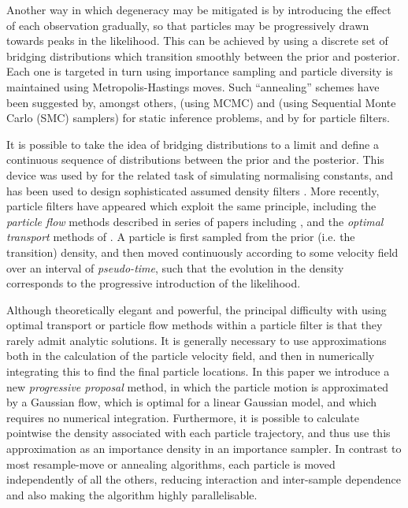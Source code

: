 \documentclass{article}
\begin{document}
Another way in which degeneracy may be mitigated is by introducing the effect of each observation gradually, so that particles may be progressively drawn towards peaks in the likelihood. This can be achieved by using a discrete set of bridging distributions which transition smoothly between the prior and posterior. Each one is targeted in turn using importance sampling and particle diversity is maintained using Metropolis-Hastings moves. Such ``annealing'' schemes have been suggested by, amongst others, \citet{Neal2001} (using MCMC) and \citet{DelMoral2006} (using Sequential Monte Carlo (SMC) samplers) for static inference problems, and by \citet{Godsill2001b,Gall2007,Deutscher2000,Oudjane2000} for particle filters.

It is possible to take the idea of bridging distributions to a limit and define a continuous sequence of distributions between the prior and the posterior. This device was used by \citet{Gelman1998} for the related task of simulating normalising constants, and has been used to design sophisticated assumed density filters \citep{Hanebeck2003a,Hanebeck2012,Hagmar2011}. More recently, particle filters have appeared which exploit the same principle, including the \emph{particle flow} methods described in series of papers including \citep{Daum2008,Daum2011d}, and the \emph{optimal transport} methods of \cite{Reich2011,Reich2012}. A particle is first sampled from the prior (i.e. the transition) density, and then moved continuously according to some velocity field over an interval of \emph{pseudo-time}, such that the evolution in the density corresponds to the progressive introduction of the likelihood.

Although theoretically elegant and powerful, the principal difficulty with using optimal transport or particle flow methods within a particle filter is that they rarely admit analytic solutions. It is generally necessary to use approximations both in the calculation of the particle velocity field, and then in numerically integrating this to find the final particle locations. In this paper we introduce a new \emph{progressive proposal} method, in which the particle motion is approximated by a Gaussian flow, which is optimal for a linear Gaussian model, and which requires no numerical integration. Furthermore, it is possible to calculate pointwise the density associated with each particle trajectory, and thus use this approximation as an importance density in an importance sampler. In contrast to most resample-move or annealing algorithms, each particle is moved independently of all the others, reducing interaction and inter-sample dependence and also making the algorithm highly parallelisable.
\end{document}
